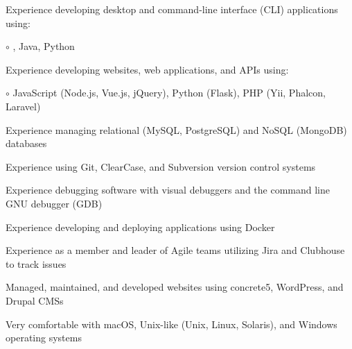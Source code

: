 \begin{itemize*}
  \item Experience developing desktop and command-line interface (CLI) applications using: %
  \begin{itemize*}
    \vspace{-0.2em}
    \item[$\circ$] \CPP, Java, Python
    \vspace{-0.2em}
  \end{itemize*}
  \item Experience developing websites, web applications, and APIs using: %
  \begin{itemize*}
    \vspace{-0.2em}
    \item[$\circ$] JavaScript (Node.js, Vue.js, jQuery), Python (Flask), PHP (Yii, Phalcon, Laravel)
  \end{itemize*}
    \vspace{-0.2em}
  \item Experience managing relational (MySQL, PostgreSQL) and NoSQL (MongoDB) databases
  \item Experience using Git, ClearCase, and Subversion version control systems
  \item Experience debugging software with visual debuggers and the command line GNU debugger (GDB)
  \item Experience developing and deploying applications using Docker
  \item Experience as a member and leader of Agile teams utilizing Jira and Clubhouse to track issues
  \item Managed, maintained, and developed websites using concrete5, WordPress, and Drupal CMSs
  \item Very comfortable with macOS, Unix-like (Unix, Linux, Solaris), and Windows operating systems
\end{itemize*}


